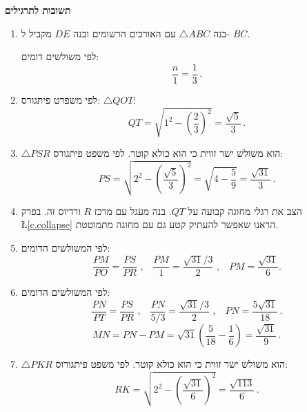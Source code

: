 \np


\begin{center}
\textbf{\Large תשובות לתרגילים}
\end{center}

\begin{enumerate}

\item
בנה
$\triangle ABC$
עם האורכים הרשומים ובנה 
$DE$
מקביל ל-%
$BC$. 
\begin{center}
\end{center}
לפי משולשים דומים:
\[
\frac{n}{1} = \frac{1}{3}\,.
\]
\item
לפי משפרט פיתגורס:
$\triangle QOT$:
\[
QT = \sqrt{1^2-\left(\frac{2}{3}\right)^2}=\frac{\sqrt{5}}{3}\,.
\]

\item $\triangle PSR$
הוא משולש ישר זווית כי הוא כולא קוטר. לפי משפט פיתגורס:
\[
PS = \sqrt{2^2-\left(\frac{\sqrt{5}}{3}\right)^2}=\sqrt{4-\frac{5}{9}}=\frac{\sqrt{31}}{3}\,.
\]

\item
הצב את רגלי מחוגה קבועה על 
$QT$.
בנה מעגל עם מרכז 
$R$
ורדיוס זה. בפרק~%
\L{\ref{c.collapse}}
הראנו שאפשר להעתיק קטע גם עם מחוגה מתמוטטת.

\item
לפי המשולשים הדומים:
\[
\frac{PM}{PO}=\frac{PS}{PR}\,\,,\;\;\;\frac{PM}{1}=\frac{\sqrt{31}/3}{2}\,\,,\;\;\;PM=\frac{\sqrt{31}}{6}.
\]

\item
לפי המשולשים הדומים:
\[
\frac{PN}{PT}=\frac{PS}{PR}\,\,,\;\;\;\frac{PN}{5/3}=\frac{\sqrt{31}/3}{2}\,\,,\;\;\;PN=\frac{5\sqrt{31}}{18}\,.
\]
\[
MN=PN-PM = \sqrt{31}\left(\frac{5}{18}-\frac{1}{6}\right) = \frac{\sqrt{31}}{9}\,.
\]

\np

\item $\triangle PKR$
הוא משולש ישר זווית כי הוא כולא קוטר. לפי משפט פיתגורוס:
\[
RK=\sqrt{2^2-\left(\frac{\sqrt{31}}{6}\right)^2} = \frac{\sqrt{113}}{6}\,.
\]


\end{enumerate}
